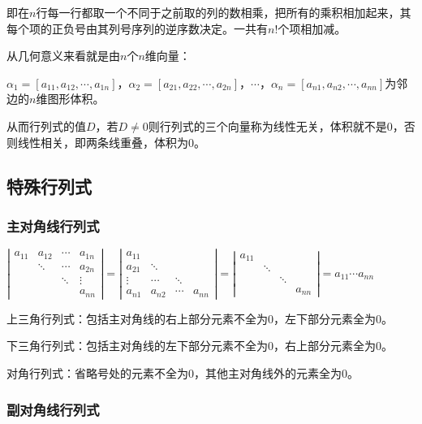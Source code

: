 \documentclass[UTF8, 12pt]{ctexart}
\begin{document}
即在$n$行每一行都取一个不同于之前取的列的数相乘，把所有的乘积相加起来，其每个项的正负号由其列号序列的逆序数决定。一共有$n!$个项相加减。

从几何意义来看就是由$n$个$n$维向量：

$\alpha_1=[a_{11},a_{12},\cdots,a_{1n}]$，$\alpha_2=[a_{21},a_{22},\cdots,a_{2n}]$，$\cdots$，$\alpha_n=[a_{n1},a_{n2},\cdots,a_{nn}]$为邻边的$n$维图形体积。

从而行列式的值$D$，若$D\neq0$则行列式的三个向量称为线性无关，体积就不是0，否则线性相关，即两条线重叠，体积为0。

\subsection{特殊行列式}

\subsubsection{主对角线行列式}

$\left|\begin{array}{cccc} 
    a_{11} & a_{12} & \cdots & a_{1n} \\
     & \ddots & \cdots & a_{2n} \\
     & & \ddots & \vdots  \\
     & & & a_{nn}
\end{array}\right|=
\left|\begin{array}{cccc} 
    a_{11} & & & \\
    a_{21} & \ddots & & \\
    \vdots & \cdots & \ddots &  \\
    a_{n1} & a_{n2} & \cdots & a_{nn}
\end{array}\right|=
\left|\begin{array}{cccc} 
    a_{11} & & & \\
     & \ddots & & \\
     & & \ddots &  \\
     & & & a_{nn}
\end{array}\right|=a_{11}\cdots a_{nn}$

上三角行列式：包括主对角线的右上部分元素不全为0，左下部分元素全为0。

下三角行列式：包括主对角线的左下部分元素不全为0，右上部分元素全为0。

对角行列式：省略号处的元素不全为0，其他主对角线外的元素全为0。

\subsubsection{副对角线行列式}
\end{document}
